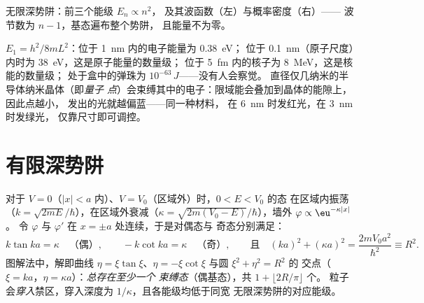 \begin{omfigure}

{\small 无限深势阱：前三个能级 $E_n \propto n^2$，
及其波函数（左）与概率密度（右）——
波节数为 $n - 1$，基态遍布整个势阱，
且能量不为零。}
\end{omfigure}

\begin{example}[数量级与颜色]\label{ex:b2:potential-wells-tunneling:orders}
$E_1 = h^2/8mL^2$：位于 \qty{1}{nm} 内的电子能量为 \qty{0.38}{eV}；
位于 \qty{0.1}{nm}（原子尺度）内时为 \qty{38}{eV}，这是原子能量的数量级；
位于 \qty{5}{fm} 内的核子为 \qty{8}{MeV}，这是核能的数量级；
处于盒中的弹珠为 $10^{-63}\,\unit{J}$——没有人会察觉。
直径仅几纳米的半导体纳米晶体（即\emph{量子
点}）会束缚其中的电子：限域能会叠加到晶体的能隙上，因此点越小，
发出的光就越偏蓝——同一种材料，
在 \qty{6}{nm} 时发红光，在 \qty{3}{nm} 时发绿光，
仅靠尺寸即可调控。
\end{example}

\section{有限深势阱}

\begin{proposition}[有限深势阱]\label{prop:b2:potential-wells-tunneling:finite}
对于 $V = 0$（$|x| < a$ 内）、$V = V_0$（区域外）时，$0 < E < V_0$ 的态
在区域内振荡（$k = \sqrt{2mE}/\hbar$），在区域外衰减（$\kappa =
\sqrt{2m(V_0 - E)}/\hbar$），墙外 $\varphi \propto \eu^{-\kappa|x|}$。
令 $\varphi$ 与 $\varphi'$ 在 $x = \pm a$ 处连续，于是对偶态与
奇态分别满足：
\[
k\tan ka = \kappa \quad\text{（偶）}, \qquad
-k\cot ka = \kappa \quad\text{（奇）}, \qquad\text{且}\quad
(ka)^2 + (\kappa a)^2 = \frac{2mV_0a^2}{\hbar^2} \equiv R^2 .
\]
图解法中，解即曲线 $\eta =
\xi\tan\xi$、$\eta = -\xi\cot\xi$ 与圆 $\xi^2 + \eta^2 = R^2$ 的
交点（$\xi = ka$，$\eta = \kappa a$）：\emph{总存在至少一个
束缚态}（偶基态），共 $1 + \lfloor 2R/\pi\rfloor$ 个。
粒子会\emph{穿入}禁区，穿入深度为
$1/\kappa$，且各能级均低于同宽
无限深势阱的对应能级。
\end{proposition}

